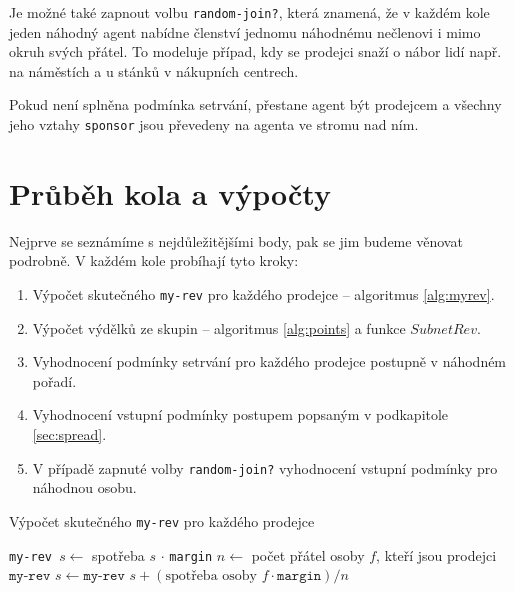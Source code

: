\documentclass[a4wide,12pt]{report}
\begin{document}
Je možné také zapnout volbu \texttt{random-join?}, která znamená, že v každém kole jeden náhodný agent nabídne členství jednomu náhodnému nečlenovi i mimo okruh svých přátel. To modeluje případ, kdy se prodejci snaží o nábor lidí např. na náměstích a u stánků v nákupních centrech.
 
Pokud není splněna podmínka setrvání, přestane agent být prodejcem a všechny jeho vztahy \texttt{sponsor} jsou převedeny na agenta ve stromu nad ním.
\section{Průběh kola a výpočty}
Nejprve se seznámíme s nejdůležitějšími body, pak se jim budeme věnovat podrobně. V každém kole probíhají tyto kroky:
\begin{enumerate}
\item Výpočet skutečného \texttt{my-rev} pro každého prodejce -- algoritmus \ref{alg:myrev}.
\item Výpočet výdělků ze skupin -- algoritmus \ref{alg:points} a funkce $SubnetRev$.
\item Vyhodnocení podmínky setrvání pro každého prodejce postupně v náhodném pořadí.
\item Vyhodnocení vstupní podmínky postupem popsaným v podkapitole \ref{sec:spread}.
\item V případě zapnuté volby \texttt{random-join?} vyhodnocení vstupní podmínky pro náhodnou osobu.
\end{enumerate}
\begin{algorithm}
\caption{Výpočet skutečného \texttt{my-rev} pro každého prodejce}
\label{alg:myrev}
\begin{algorithmic}[]

  \STATE \texttt{my-rev }$s\gets$ spotřeba $s$ $\cdot$ \texttt{margin}
  \STATE{}
    \STATE $n\gets $ počet přátel osoby $f$, kteří jsou prodejci
    \STATE $\texttt{my-rev }s\gets\texttt{my-rev }s+(\text{spotřeba osoby }f \cdot \texttt{margin}) / n$
  \ENDFOR
\ENDFOR
\end{algorithmic}
\end{algorithm}
\end{document}

